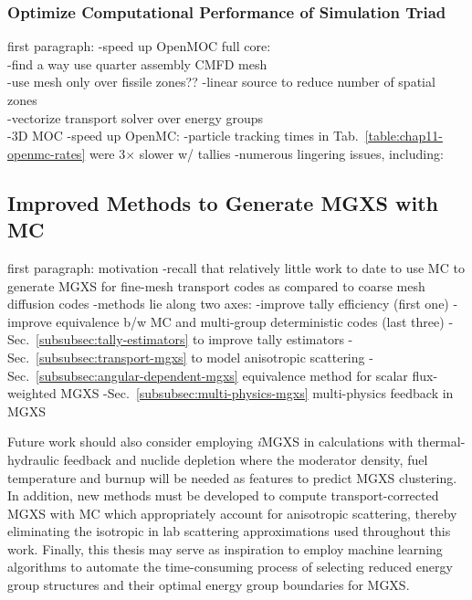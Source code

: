 \subsubsection{Optimize Computational Performance of Simulation Triad}
\label{subsubsec:chap12-optimize-simulation-triad}

first paragraph:
-speed up OpenMOC full core: \\
  -find a way use quarter assembly CMFD mesh \\
    -use mesh only over fissile zones??
  -linear source to reduce number of spatial zones \\
  -vectorize transport solver over energy groups \\
  -3D \ac{MOC}
-speed up OpenMC:
  -particle tracking times in Tab.~\ref{table:chap11-openmc-rates} were 3$\times$ slower w/ tallies
  -numerous lingering issues, including: 

\subsection{Improved Methods to Generate MGXS with MC}
\label{subsec:chap12-improve-mc-methods}

first paragraph: motivation
-recall that relatively little work to date to use \ac{MC} to generate \ac{MGXS} for fine-mesh transport codes as compared to coarse mesh diffusion codes
-methods lie along two axes:
  -improve tally efficiency (first one)
  -improve equivalence b/w \ac{MC} and multi-group deterministic codes (last three)
-Sec.~\ref{subsubsec:tally-estimators} to improve tally estimators
-Sec.~\ref{subsubsec:transport-mgxs} to model anisotropic scattering
-Sec.~\ref{subsubsec:angular-dependent-mgxs} equivalence method for scalar flux-weighted \ac{MGXS}
-Sec.~\ref{subsubsec:multi-physics-mgxs} multi-physics feedback in \ac{MGXS}

Future work should also consider employing \textit{i}MGXS in calculations with thermal-hydraulic feedback and nuclide depletion where the moderator density, fuel temperature and burnup will be needed as features to predict MGXS clustering. In addition, new methods must be developed to compute transport-corrected MGXS with MC which appropriately account for anisotropic scattering, thereby eliminating the isotropic in lab scattering approximations used throughout this work. Finally, this thesis may serve as inspiration to employ machine learning algorithms to automate the time-consuming process of selecting reduced energy group structures and their optimal energy group boundaries for MGXS.

